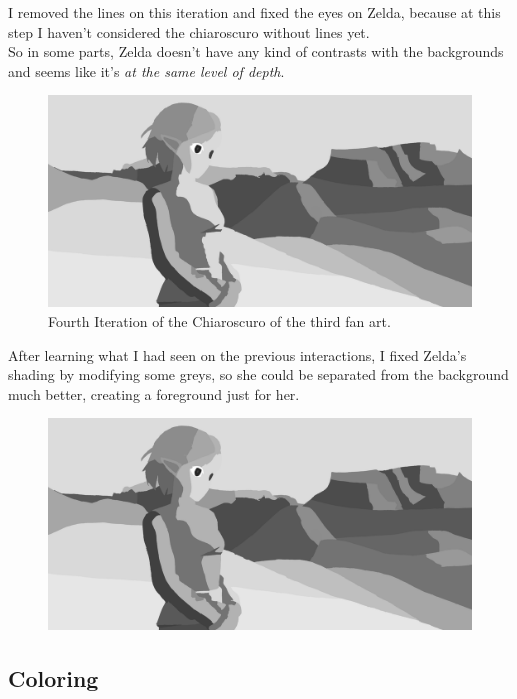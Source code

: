 \documentclass{cup-pan}
\begin{document}
        I removed the lines on this iteration and fixed the eyes on Zelda, because at this step I haven't considered the chiaroscuro without lines yet.\\ 
        So in some parts, Zelda doesn't have any kind of contrasts with the backgrounds and seems like it's \textit{at the same level of depth}.
        \begin{figure}[H]
            \includegraphics[width=\textwidth]{Fanart3/2_Claroscuro/IIII_Claroscuro.png}
            \caption{Fourth Iteration of the Chiaroscuro of the third fan art.}
        \end{figure}

        After learning what I had seen on the previous interactions, I fixed Zelda's shading by modifying some greys, so she could be separated from the background much better, creating a foreground just for her.
        \begin{figure}[H]
            \includegraphics[width=\textwidth]{Fanart3/2_Claroscuro/IIIII_Claroscuro.png}
        \end{figure}

    \subsection{Coloring}
\end{document}
